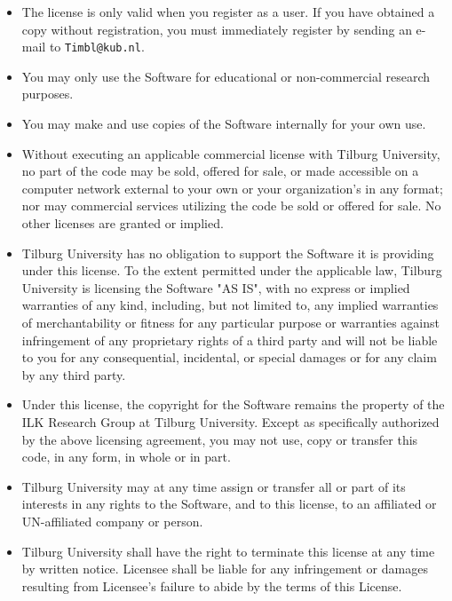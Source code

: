 \documentclass{report}
\begin{document}
\begin{itemize}

\item The license is only valid when you register as a user. If you
have obtained a copy without registration, you must immediately
register by sending an e-mail to {\tt Timbl@kub.nl}.

\item You may only use the Software for educational or non-commercial
research purposes. 

\item You may make and use copies of the Software internally for your
own use.

\item Without executing an applicable commercial license with Tilburg
University, no part of the code may be sold, offered for sale, or made
accessible on a computer network external to your own or your
organization's in any format; nor may commercial services utilizing
the code be sold or offered for sale. No other licenses are granted or
implied.

\item Tilburg University has no obligation to support the Software it
is providing under this license.  To the extent permitted under the
applicable law, Tilburg University is licensing the Software "AS IS",
with no express or implied warranties of any kind, including, but not
limited to, any implied warranties of merchantability or fitness for
any particular purpose or warranties against infringement of any
proprietary rights of a third party and will not be liable to you for
any consequential, incidental, or special damages or for any claim by
any third party.

\item Under this license, the copyright for the Software remains the
property of the ILK Research Group at Tilburg University.  Except as
specifically authorized by the above licensing agreement, you may not
use, copy or transfer this code, in any form, in whole or in part.

\item Tilburg University may at any time assign or transfer all or
part of its interests in any rights to the Software, and to this
license, to an affiliated or UN-affiliated company or person.

\item Tilburg University shall have the right to terminate this
license at any time by written notice. Licensee shall be liable for
any infringement or damages resulting from Licensee's failure to abide
by the terms of this License.


\end{itemize}
\end{document}
